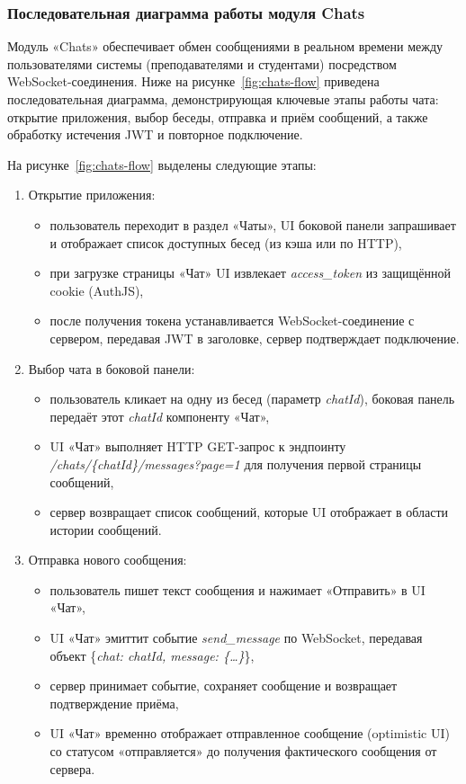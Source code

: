 \subsubsection{Последовательная диаграмма работы модуля Chats}
Модуль «Chats» обеспечивает обмен сообщениями в реальном времени между пользователями системы (преподавателями и студентами) посредством WebSocket-соединения. Ниже на рисунке~\ref{fig:chats-flow} приведена последовательная диаграмма, демонстрирующая ключевые этапы работы чата: открытие приложения, выбор беседы, отправка и приём сообщений, а также обработку истечения JWT и повторное подключение.

На рисунке~\ref{fig:chats-flow} выделены следующие этапы:

\begin{enumerate}
    \item Открытие приложения:
    \begin{itemize}
        \item пользователь переходит в раздел «Чаты», UI боковой панели запрашивает и отображает список доступных бесед (из кэша или по HTTP),
        \item при загрузке страницы «Чат» UI извлекает \textit{access\_token} из защищённой cookie (AuthJS),
        \item после получения токена устанавливается WebSocket-соединение с сервером, передавая JWT в заголовке, сервер подтверждает подключение.
    \end{itemize}

    \item Выбор чата в боковой панели:
    \begin{itemize}
        \item пользователь кликает на одну из бесед (параметр \textit{chatId}), боковая панель передаёт этот \textit{chatId} компоненту «Чат»,
        \item UI «Чат» выполняет HTTP GET-запрос к эндпоинту \textit{/chats/\{chatId\}/messages?page=1} для получения первой страницы сообщений,
        \item сервер возвращает список сообщений, которые UI отображает в области истории сообщений.
    \end{itemize}

    \item Отправка нового сообщения:
    \begin{itemize}
        \item пользователь пишет текст сообщения и нажимает «Отправить» в UI «Чат»,
        \item UI «Чат» эмиттит событие \textit{send\_message} по WebSocket, передавая объект \{\textit{chat: chatId, message: \{\ldots\}}\},
        \item сервер принимает событие, сохраняет сообщение и возвращает подтверждение приёма,
        \item UI «Чат» временно отображает отправленное сообщение (optimistic UI) со статусом «отправляется» до получения фактического сообщения от сервера.
    \end{itemize}


\end{enumerate}
